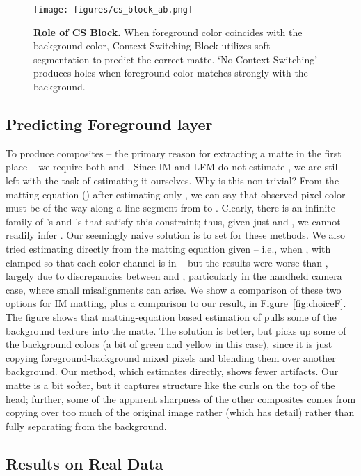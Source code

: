 \documentclass[10pt,twocolumn,letterpaper]{article}
\begin{document}
\begin{figure*}[!ht]
	\centering
	\texttt{[image: figures/cs\_block\_ab.png]}
	\caption{\small \textbf{Role of CS Block.} When foreground color coincides with the background color, Context Switching Block utilizes soft segmentation to predict the correct matte. `No Context Switching' produces holes when foreground color matches strongly with the background.}
\label{fig:cs_block_ab}	
\end{figure*}



\subsection{Predicting Foreground layer }
\label{sec:fg}
To produce composites -- the primary reason for extracting a matte in the first place -- we require both  and .  Since IM and LFM do not estimate , we are still left with the task of estimating it ourselves.  Why is this non-trivial?  From the matting equation () after estimating only , we can say that observed pixel color  must be  of the way along a line segment from  to .  Clearly, there is an infinite family of 's and 's that satisfy this constraint; thus, given just  and , we cannot readily infer .  Our seemingly naive solution is to set  for these methods.  We also tried estimating  directly from the matting equation given  -- i.e.,  when , with  clamped so that each color channel is in  -- but the results were worse than , largely due to discrepancies between  and , particularly in the handheld camera case, where small misalignments can arise. We show a comparison of these two options for IM matting, plus a comparison to our result, in Figure~\ref{fig:choiceF}.  The figure shows that matting-equation based estimation of  pulls some of the background texture into the matte.  The  solution is better, but picks up some of the background colors (a bit of green and yellow in this case), since it is just copying foreground-background mixed pixels and blending them over another background.  Our method, which estimates  directly, shows fewer artifacts.  Our matte is a bit softer, but it captures structure like the curls on the top of the head; further, some of the apparent sharpness of the other composites comes from copying over too much of the original image rather (which has detail) rather than fully separating  from the background.




\subsection{Results on Real Data}
\end{document}
